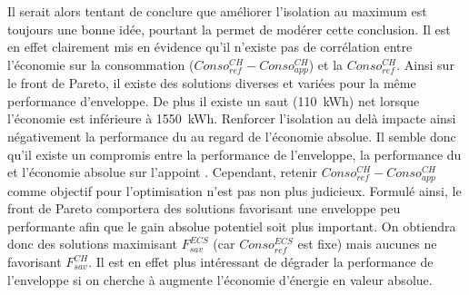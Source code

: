 Il serait alors tentant de conclure que améliorer l’isolation au maximum est
toujours une bonne idée, pourtant la  permet
de modérer cette conclusion. Il est en effet clairement mis en évidence
qu’il n’existe pas de corrélation entre l’économie sur la consommation
($Conso_{ref}^{CH} - Conso_{app}^{CH}$) et la $Conso_{ref}^{CH}$. Ainsi sur le front de Pareto, il existe des solutions diverses
et variées pour la même performance d’enveloppe. De plus il existe un saut (\SI{110}{kWh})
net lorsque l’économie est inférieure à \SI{1550}{kWh}. Renforcer l’isolation
au delà impacte ainsi négativement la performance du  au regard de l’économie
absolue. Il semble donc qu’il existe un compromis entre la performance de l’enveloppe,
la performance du  et l’économie absolue sur l’appoint .
Cependant, retenir $Conso_{ref}^{CH} - Conso_{app}^{CH}$ comme objectif
pour l’optimisation n’est pas non plus judicieux. Formulé ainsi, le front de Pareto
comportera des solutions favorisant une enveloppe peu performante afin que le gain
absolue potentiel soit plus important. On obtiendra donc des solutions
maximisant $F_{sav}^{ECS}$ (car $Conso_{ref}^{ECS}$ est fixe) mais aucunes ne
favorisant $F_{sav}^{CH}$. Il est en effet plus intéressant de dégrader la performance
de l’enveloppe si on cherche à augmente l’économie d’énergie en valeur absolue.


